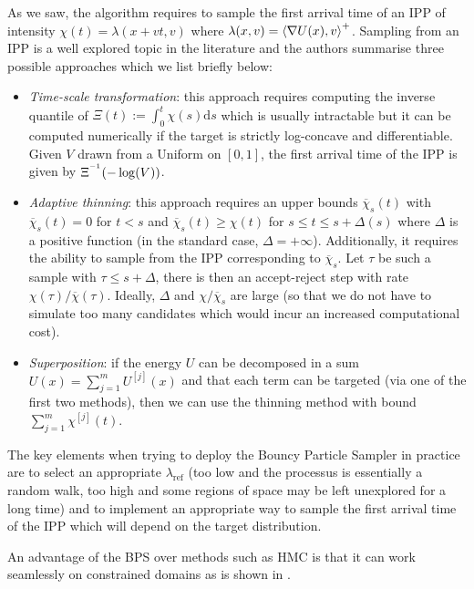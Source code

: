 As we saw, the algorithm requires to sample the first arrival time of an IPP of intensity $\chi(t)=\lambda(x+vt,v)$ where $\lambda(x,v)=\left\langle \nabla U(x),v \right\rangle^{+}$. Sampling from an IPP is a well explored topic in the literature and the authors summarise three possible approaches which we list briefly below:
\begin{itemize}
	\item   \emph{Time-scale transformation}: this approach requires computing the inverse quantile of $\Xi(t):=\int_{0}^{t} \chi(s)\mathrm{d}s$ which is usually intractable but it can be computed numerically if the target is strictly log-concave and differentiable. Given $V$ drawn from a Uniform on $[0,1]$, the first arrival time of the IPP is given by $\Xi^{^{-1}}(-\log(V))$.
 \item   \emph{Adaptive thinning}: this approach requires an upper bounds $\overline{\chi}_{s}(t)$ with $\overline\chi_{s}(t)=0$ for $t<s$ and $\overline\chi_{s}(t)\ge\chi(t)$ for $s\le t\le s+\Delta(s)$ where $\Delta$ is a positive function (in the standard case, $\Delta=+\infty$). Additionally, it requires the ability to sample from the IPP corresponding to $\overline\chi_{s}$. Let $\tau$ be such a sample with $\tau\le s+\Delta$, there is then an accept-reject step with rate $\chi(\tau)/\overline\chi(\tau)$. Ideally, $\Delta$ and $\chi/\overline\chi_{s}$ are large (so that we do not have to simulate too many candidates which would incur an increased computational cost).
 \item   \emph{Superposition}: if the energy $U$ can be decomposed in a sum $U(x)=\sum_{j=1}^{m}U^{[j]}(x)$ and that each term can be targeted (via one of the first two methods), then we can use the thinning method with bound $\sum_{j=1}^{m}\chi^{[j]}(t)$.
 \end{itemize}
The key elements when trying to deploy the Bouncy Particle Sampler in practice are to select an appropriate $\lambda_{\text{ref}}$ (too low and the processus is essentially a random walk, too high and some regions of space may be left unexplored for a long time) and to implement an appropriate way to sample the first arrival time of the IPP which will depend on the target distribution.

An advantage of the BPS over methods such as HMC is that it can work seamlessly on constrained domains as is shown in \citet{bierkens17}.


%


